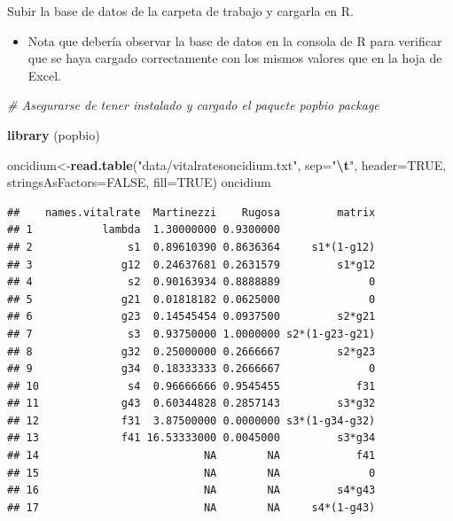 \documentclass[
]{book}
\newenvironment{Shaded}{\begin{snugshade}}{\end{snugshade}}
\newcommand{\AttributeTok}[1]{\textcolor[rgb]{0.13,0.29,0.53}{#1}}
\newcommand{\CommentTok}[1]{\textcolor[rgb]{0.56,0.35,0.01}{\textit{#1}}}
\newcommand{\ConstantTok}[1]{\textcolor[rgb]{0.56,0.35,0.01}{#1}}
\newcommand{\FunctionTok}[1]{\textcolor[rgb]{0.13,0.29,0.53}{\textbf{#1}}}
\newcommand{\NormalTok}[1]{#1}
\newcommand{\OtherTok}[1]{\textcolor[rgb]{0.56,0.35,0.01}{#1}}
\newcommand{\SpecialCharTok}[1]{\textcolor[rgb]{0.81,0.36,0.00}{\textbf{#1}}}
\newcommand{\StringTok}[1]{\textcolor[rgb]{0.31,0.60,0.02}{#1}}
\providecommand{\tightlist}{%
  \setlength{\itemsep}{0pt}\setlength{\parskip}{0pt}}
\theoremstyle{definition}
\theoremstyle{definition}
\theoremstyle{definition}
\theoremstyle{definition}
\theoremstyle{remark}
\begin{document}
Subir la base de datos de la carpeta de trabajo y cargarla en R.

\begin{itemize}
\tightlist
\item
  Nota que debería observar la base de datos en la consola de R para verificar que se haya cargado correctamente con los mismos valores que en la hoja de Excel.
\end{itemize}

\begin{Shaded}
\begin{Highlighting}[]
\CommentTok{\# Asegurarse de tener instalado y cargado el paquete \textquotesingle{}popbio\textquotesingle{} package }



\FunctionTok{library}\NormalTok{ (popbio)}

\NormalTok{oncidium}\OtherTok{\textless{}{-}}\FunctionTok{read.table}\NormalTok{(}\StringTok{"data/vitalratesoncidium.txt"}\NormalTok{, }\AttributeTok{sep=}\StringTok{"}\SpecialCharTok{\textbackslash{}t}\StringTok{"}\NormalTok{, }\AttributeTok{header=}\ConstantTok{TRUE}\NormalTok{, }\AttributeTok{stringsAsFactors=}\ConstantTok{FALSE}\NormalTok{, }\AttributeTok{fill=}\ConstantTok{TRUE}\NormalTok{)}
\NormalTok{oncidium }
\end{Highlighting}
\end{Shaded}

\begin{verbatim}
##    names.vitalrate  Martinezzi    Rugosa         matrix
## 1           lambda  1.30000000 0.9300000               
## 2               s1  0.89610390 0.8636364     s1*(1-g12)
## 3              g12  0.24637681 0.2631579         s1*g12
## 4               s2  0.90163934 0.8888889              0
## 5              g21  0.01818182 0.0625000              0
## 6              g23  0.14545454 0.0937500         s2*g21
## 7               s3  0.93750000 1.0000000 s2*(1-g23-g21)
## 8              g32  0.25000000 0.2666667         s2*g23
## 9              g34  0.18333333 0.2666667              0
## 10              s4  0.96666666 0.9545455            f31
## 11             g43  0.60344828 0.2857143         s3*g32
## 12             f31  3.87500000 0.0000000 s3*(1-g34-g32)
## 13             f41 16.53333000 0.0045000         s3*g34
## 14                          NA        NA            f41
## 15                          NA        NA              0
## 16                          NA        NA         s4*g43
## 17                          NA        NA     s4*(1-g43)
\end{verbatim}
\end{document}
